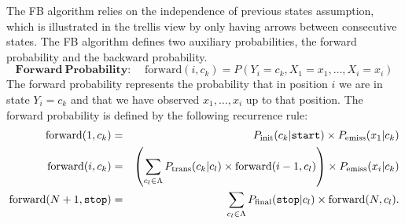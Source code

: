 The FB algorithm relies on the independence of previous states
assumption, which  
is illustrated in the trellis view by only having arrows between consecutive states. 
The FB algorithm defines two auxiliary probabilities, the forward probability and the backward probability. 
\begin{equation}
\label{eq::forward}
\mathbf{Forward \ Probability\!:}\;\;\;\;  \mathrm{forward}(i, c_k) = P(Y_i = c_k, X_1=x_1,\ldots, X_i = x_i)
\end{equation}
The forward probability represents the probability that in position
$i$ we are in state $Y_i = c_k$ and that we have observed $x_1,\ldots,x_i$
up to that position. The forward probability is defined by the
following recurrence rule: 
\begin{eqnarray}
\mathrm{forward}(1, c_k) &=& P_{\mathrm{init}}(c_k|\text{\tt start}) \times 
P_{\mathrm{emiss}}(x_1 | c_k)
 \\
 \mathrm{forward}(i, c_k) &=& \left( \displaystyle \sum_{c_l \in \Lambda} P_{\mathrm{trans}}(c_k | c_l) \times \mathrm{forward}(i-1, c_l) \right) \times P_{\mathrm{emiss}}(x_i | c_k)  \label{forwardRecursion}
 \\
  \mathrm{forward}(N+1, \text{\tt stop}) &=& \sum_{c_l \in \Lambda} P_{\mathrm{final}}(\text{\tt stop} | c_l) \times \mathrm{forward}(N, c_l).
\end{eqnarray}

%
%


